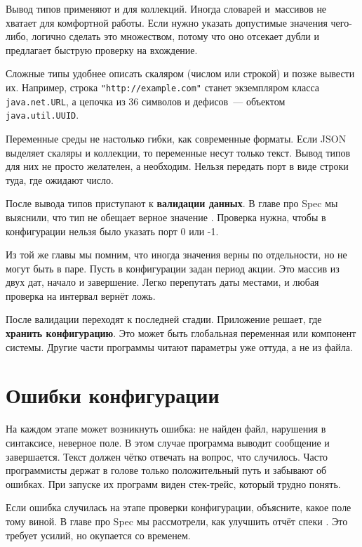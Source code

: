 Вывод типов применяют и для коллекций. Иногда словарей и~массивов не хватает для
комфортной работы. Если нужно указать допустимые значения чего-либо, логично
сделать это множеством, потому что оно отсекает дубли и предлагает быструю
проверку на вхождение.

Сложные типы удобнее описать скаляром (числом или строкой) и позже вывести
их. Например, строка \verb|"http://example.com"| станет экземпляром класса
\verb|java.net.URL|, а цепочка из 36 символов и дефисов~--- объектом
\verb|java.util.UUID|.

Переменные среды не настолько гибки, как современные форматы. Если JSON выделяет
скаляры и коллекции, то переменные несут только текст. Вывод типов для них не
просто желателен, а необходим. Нельзя передать порт в виде строки туда, где
ожидают число.


После вывода типов приступают к \textbf{валидации данных}. В главе про Spec мы
выяснили, что тип не обещает верное значение . Проверка
нужна, чтобы в конфигурации нельзя было указать порт 0 или -1.

Из той же главы мы помним, что иногда значения верны по отдельности, но не могут
быть в паре. Пусть в конфигурации задан период акции. Это массив из двух дат,
начало и завершение. Легко перепутать даты местами, и любая проверка на интервал
вернёт ложь.

После валидации переходят к последней стадии. Приложение решает, где
\textbf{хранить конфигурацию}. Это может быть глобальная переменная или
компонент системы. Другие части программы читают параметры уже оттуда, а не из
файла.

\section{Ошибки конфигурации}


На каждом этапе может возникнуть ошибка: не найден файл, нарушения в синтаксисе,
неверное поле. В этом случае программа выводит сообщение и завершается.  Текст
должен чётко отвечать на вопрос, что случилось. Часто программисты держат в
голове только положительный путь и забывают об ошибках. При запуске их программ
виден стек-трейс, который трудно понять.

Если ошибка случилась на этапе проверки конфигурации, объясните, какое поле тому
виной. В главе про Spec мы рассмотрели, как улучшить отчёт
спеки .  Это требует усилий, но окупается со временем.

